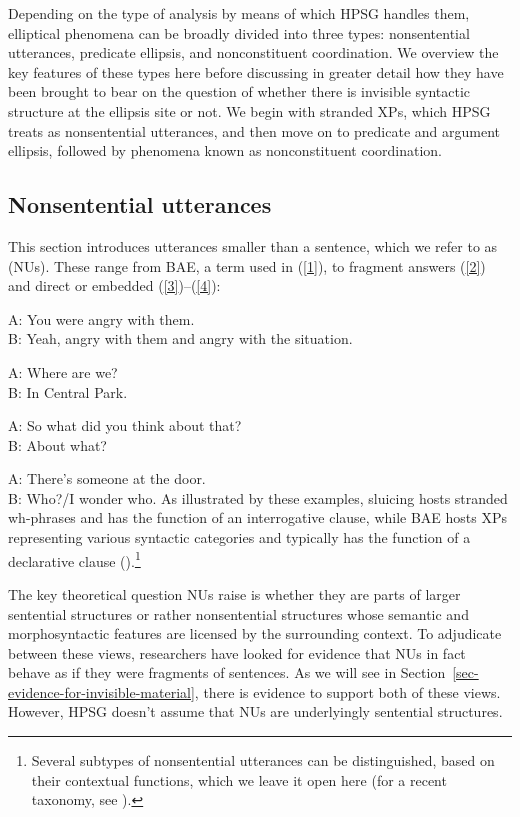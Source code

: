 \documentclass[output=paper
	        ,collection
	        ,collectionchapter
 	        ,biblatex
                ,babelshorthands
                ,newtxmath
                ,draftmode
                ,colorlinks, citecolor=brown
]{langscibook}
\begin{document}
{Depending on the type of analysis by means of which HPSG handles them, elliptical phenomena can be broadly divided into three types:
         nonsentential utterances, predicate ellipsis, and nonconstituent coordination.
          We overview the key features of these types here before discussing in greater detail how they have been brought to bear on the question of whether there is invisible syntactic structure at the ellipsis site or not. We begin with stranded XPs, which HPSG treats as nonsentential utterances, and then move on to predicate and argument ellipsis, followed by phenomena known as nonconstituent coordination.


\subsection{Nonsentential utterances}
This section introduces utterances smaller than a sentence, which we refer to as \emph{} (NUs). These range from \emph{} BAE, a term used in \citealt{CJ2005a} (\ref{1}), to fragment answers (\ref{2})
and direct or embedded  (\ref{3})--(\ref{4}):

\ea A: You were angry with them.\\ B: Yeah, angry with them and angry with the situation.\label{1}\z

\ea A: Where are we? \\B: In Central Park.\label{2}\z

\ea A: So what did you think about that?\\ B: About what? \label{3}\z

\ea A: There's someone at the door. \\B: Who?/I wonder who. \label{4}\z
%
As illustrated by these examples, sluicing hosts stranded wh-phrases and has the function of an interrogative clause, while BAE hosts XPs representing various syntactic categories and typically has the function of a declarative clause (\citealt{CJ2005a}).\footnote{Several subtypes of nonsentential utterances can be distinguished, based on their contextual functions, which we leave it open here (for a recent taxonomy, see \citealt[217]{Ginzburg2012}).}

The key theoretical question NUs raise is whether they are parts of larger sentential structures or rather nonsentential structures whose semantic and morphosyntactic features are licensed by the surrounding context. To adjudicate between these views, researchers have looked for evidence that NUs in fact behave as if they were fragments of sentences. As we will see in Section~\ref{sec-evidence-for-invisible-material}, there is evidence to support both of these views. However, HPSG doesn't assume that NUs are underlyingly sentential structures.

}
\end{document}
